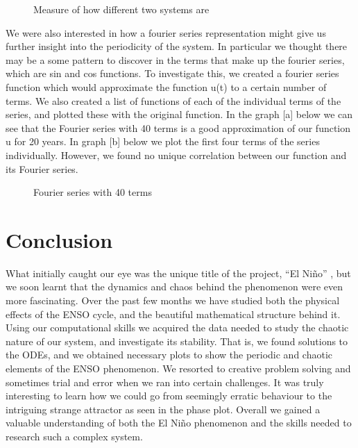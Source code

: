 \documentclass{article}
\begin{document}
\begin{figure}[h]
    \centering
    \qquad
    \caption{Measure of how different two systems are}%
    \label{fig:example}%
\end{figure}

We were also interested in how a fourier series representation might give us further insight into the periodicity of the system. In particular we thought there may be a some pattern to discover in the terms that make up the fourier series, which are sin and cos functions. To investigate this, we created a fourier series function which would approximate the function u(t) to a certain number of terms. We also created a list of functions of each of the individual terms of the series, and plotted these with the original function. In the graph [a] below we can see that the Fourier series with 40 terms is a good approximation of our function u for 20 years. In graph [b] below we plot the first four terms of the series individually. However, we found no unique correlation between our function and its Fourier series.

\begin{figure}[h]
    \centering
    \qquad
    \caption{Fourier series with 40 terms}%
    \label{fig:example}%
\end{figure}

\newpage

\section{Conclusion}

What initially caught our eye was the unique title of the project, “El Niño” , but we soon learnt that the dynamics and chaos behind the phenomenon were even more fascinating. Over the past few months we have studied both the physical effects of the ENSO cycle, and the beautiful mathematical structure behind it. Using our computational skills we acquired the data needed to study the chaotic nature of our system, and investigate its stability. That is, we found solutions to the ODEs, and we obtained necessary plots to show the periodic and chaotic elements of the ENSO phenomenon.  We resorted to creative problem solving and sometimes trial and error when we ran into certain challenges. It was truly interesting to learn how we could go from seemingly erratic behaviour to the intriguing strange attractor as seen in the phase plot.  Overall we gained a valuable understanding of both the El Niño phenomenon and the skills needed to research such a complex system.
\end{document}
